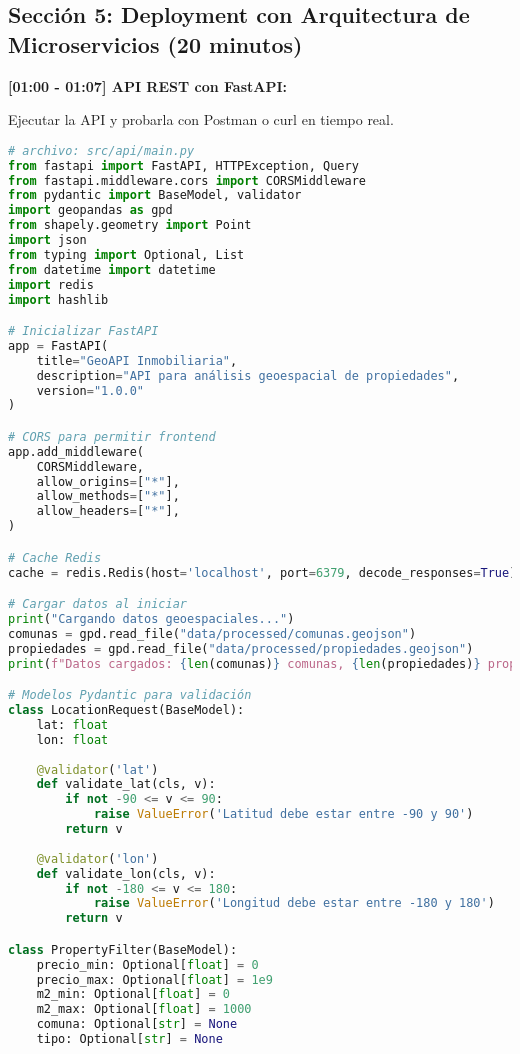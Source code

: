\documentclass[11pt,a4paper]{article}
\begin{document}
\subsection{Sección 5: Deployment con Arquitectura de Microservicios (20 minutos)}

\textbf{[01:00 - 01:07] API REST con FastAPI:}

\begin{demobox}
Ejecutar la API y probarla con Postman o curl en tiempo real.
\end{demobox}

\begin{lstlisting}[language=Python]
# archivo: src/api/main.py
from fastapi import FastAPI, HTTPException, Query
from fastapi.middleware.cors import CORSMiddleware
from pydantic import BaseModel, validator
import geopandas as gpd
from shapely.geometry import Point
import json
from typing import Optional, List
from datetime import datetime
import redis
import hashlib

# Inicializar FastAPI
app = FastAPI(
    title="GeoAPI Inmobiliaria",
    description="API para análisis geoespacial de propiedades",
    version="1.0.0"
)

# CORS para permitir frontend
app.add_middleware(
    CORSMiddleware,
    allow_origins=["*"],
    allow_methods=["*"],
    allow_headers=["*"],
)

# Cache Redis
cache = redis.Redis(host='localhost', port=6379, decode_responses=True)

# Cargar datos al iniciar
print("Cargando datos geoespaciales...")
comunas = gpd.read_file("data/processed/comunas.geojson")
propiedades = gpd.read_file("data/processed/propiedades.geojson")
print(f"Datos cargados: {len(comunas)} comunas, {len(propiedades)} propiedades")

# Modelos Pydantic para validación
class LocationRequest(BaseModel):
    lat: float
    lon: float
    
    @validator('lat')
    def validate_lat(cls, v):
        if not -90 <= v <= 90:
            raise ValueError('Latitud debe estar entre -90 y 90')
        return v
    
    @validator('lon')
    def validate_lon(cls, v):
        if not -180 <= v <= 180:
            raise ValueError('Longitud debe estar entre -180 y 180')
        return v

class PropertyFilter(BaseModel):
    precio_min: Optional[float] = 0
    precio_max: Optional[float] = 1e9
    m2_min: Optional[float] = 0
    m2_max: Optional[float] = 1000
    comuna: Optional[str] = None
    tipo: Optional[str] = None


\end{lstlisting}
\end{document}
